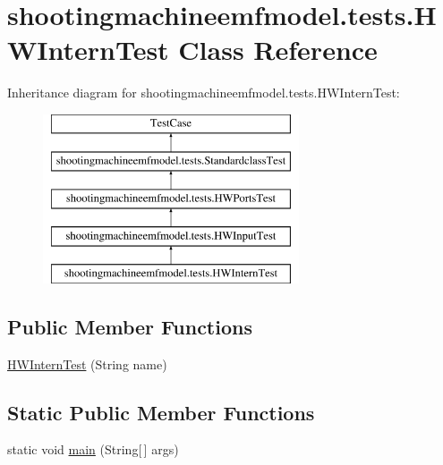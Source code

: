 \hypertarget{classshootingmachineemfmodel_1_1tests_1_1_h_w_intern_test}{\section{shootingmachineemfmodel.\-tests.\-H\-W\-Intern\-Test Class Reference}
\label{classshootingmachineemfmodel_1_1tests_1_1_h_w_intern_test}
}
Inheritance diagram for shootingmachineemfmodel.\-tests.\-H\-W\-Intern\-Test\-:\begin{figure}[H]
\begin{center}
\leavevmode
\includegraphics[height=5.000000cm]{classshootingmachineemfmodel_1_1tests_1_1_h_w_intern_test}
\end{center}
\end{figure}
\subsection*{Public Member Functions}
\begin{DoxyCompactItemize}
\item 
\hyperlink{classshootingmachineemfmodel_1_1tests_1_1_h_w_intern_test_aa2c36926e8579e043b563c5c88f9b934}{H\-W\-Intern\-Test} (String name)
\end{DoxyCompactItemize}
\subsection*{Static Public Member Functions}
\begin{DoxyCompactItemize}
\item 
static void \hyperlink{classshootingmachineemfmodel_1_1tests_1_1_h_w_intern_test_a0897237620ee4d614a2b64f7a846f964}{main} (String\mbox{[}$\,$\mbox{]} args)
\end{DoxyCompactItemize}
